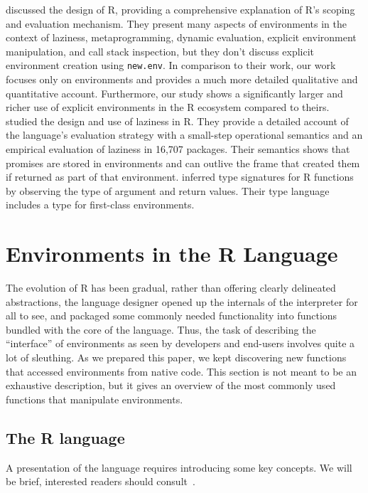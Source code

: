 \documentclass[10pt,review,sigplan,anonymous=true,authorversion=true,nonacm=true]{acmart}
\newcommand{\code}[1]{\lstinline |#1|\xspace}
\begin{document}
\citet{ecoop12} discussed the design of R, providing a comprehensive explanation
of R's scoping and evaluation mechanism. They present many aspects of
environments in the context of laziness, metaprogramming, dynamic evaluation,
explicit environment manipulation, and call stack inspection, but they don't
discuss explicit environment creation using \code{new.env}. In comparison to
their work, our work focuses only on environments and provides a much more
detailed qualitative and quantitative account. Furthermore, our study shows a
significantly larger and richer use of explicit environments in the R ecosystem
compared to theirs. \citet{oopsla19b} studied the design and use of laziness in
R. They provide a detailed account of the language’s evaluation strategy with a
small-step operational semantics and an empirical evaluation of laziness in
16,707 packages. Their semantics shows that promises are stored in environments
and can outlive the frame that created them if returned as part of that
environment. \citet{oopsla20b} inferred type signatures for R functions by
observing the type of argument and return values. Their type language includes a
type for first-class environments.


\section{Environments in the R Language}

The evolution of R has been gradual, rather than offering clearly delineated
abstractions, the language designer opened up the internals of the interpreter
for all to see, and packaged some commonly needed functionality into functions
bundled with the core of the language. Thus, the task of describing the
``interface'' of environments as seen by developers and end-users involves quite
a lot of sleuthing. As we prepared this paper, we kept discovering new functions
that accessed environments from native code. This section is not meant to be an
exhaustive description, but it gives an overview of the most commonly used
functions that manipulate environments.

\subsection{The R language}

A presentation of the language requires introducing some key concepts. We will
be brief, interested readers should consult~\cite{AdvancedR}.
\end{document}
